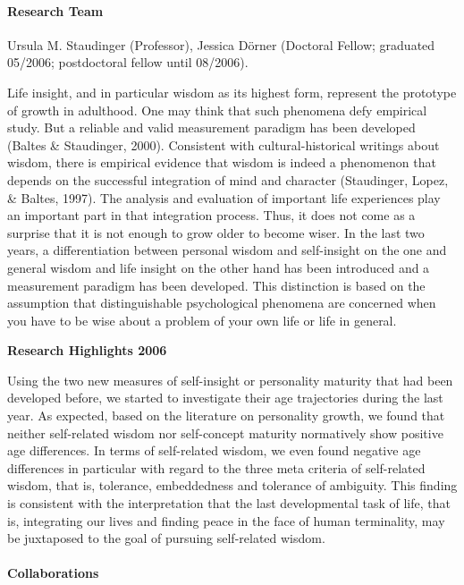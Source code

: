 

\paragraph{Research Team}
Ursula M. Staudinger (Professor), Jessica D\"orner (Doctoral Fellow; graduated 05/2006; postdoctoral fellow until 08/2006).

Life insight, and in particular wisdom as its highest form, represent the prototype of growth in adulthood. One may think that such phenomena defy empirical study. But a reliable and valid measurement paradigm has been developed (Baltes \& Staudinger, 2000). Consistent with cultural-historical writings about wisdom, there is empirical evidence that wisdom is indeed a phenomenon that depends on the successful integration of mind and character (Staudinger, Lopez, \& Baltes, 1997). The analysis and evaluation of important life experiences play an important part in that integration process. Thus, it does not come as a surprise that it is not enough to grow older to become wiser. In the last two years, a differentiation between personal wisdom and self-insight on the one and general wisdom and life insight on the other hand has been introduced and a measurement paradigm has been developed. This distinction is based on the assumption that distinguishable psychological phenomena are concerned when you have to be wise about a problem of your own life or life in general.

\null
\textbf{Research Highlights 2006}

Using the two new measures of self-insight or personality maturity that had been developed before, we started to investigate their age trajectories during the last year. As expected, based on the literature on personality growth, we found that neither self-related wisdom nor self-concept maturity normatively show positive age differences. In terms of self-related wisdom, we even found negative age differences in particular with regard to the three meta criteria of self-related wisdom, that is, tolerance, embeddedness and tolerance of ambiguity. This finding is consistent with the interpretation that the last developmental task of life, that is, integrating our lives and finding peace in the face of human terminality, may be juxtaposed to the goal of pursuing self-related wisdom.

\paragraph{Collaborations}

